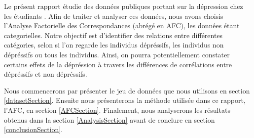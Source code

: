 Le présent rapport étudie des données publiques portant sur la dépression chez les étudiants \citep{dataset}. Afin de traiter et analyser ces données, nous avons choisis l'Analyse Factorielle des Correspondances (abrégé en AFC), les données étant categorielles. Notre objectif est d'identifier des relations entre différentes catégories, selon si l'on regarde les individus dépréssifs, les individus non dépréssifs ou tous les individus. Ainsi, on pourra potentiellement constater certains effets de la dépréssion à travers les différences de corrélations entre dépréssifs et non dépréssifs.

Nous commencerons par présenter le jeu de données que nous utilisons en section \ref{datasetSection}.
Ensuite nous présenterons la méthode utilisée dans ce rapport, l'AFC, en section \ref{AFCSection}. Finalement, nous analyserons les résultats obtenus dans la section \ref{AnalysisSection} avant de conclure en section \ref{conclusionSection}.
